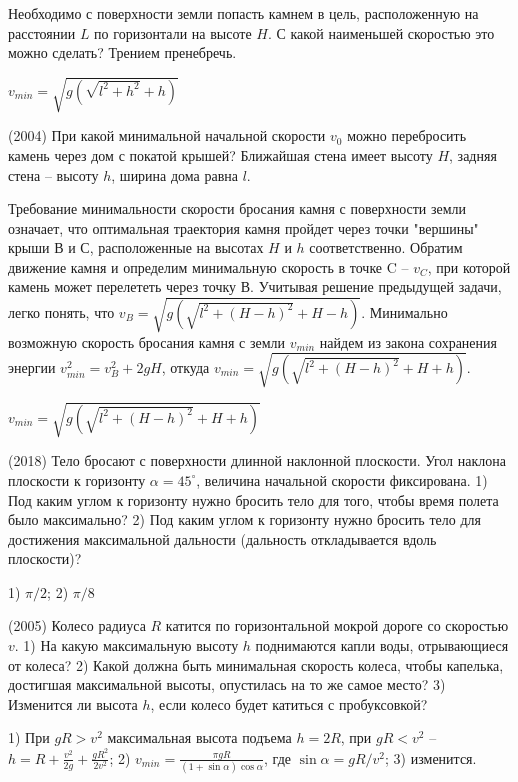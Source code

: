 \begin{ex}
Необходимо с поверхности земли попасть камнем в цель, расположенную на расстоянии $L$ по горизонтали на высоте $H$. С какой наименьшей скоростью это можно сделать? Трением пренебречь.
\begin{ans}
$v_{min} = \sqrt{g \left(\sqrt{l^2 + h^2} + h \right)}$
\end{ans}
\end{ex}

\begin{ex}
(2004) При какой минимальной начальной скорости $v_0$ можно перебросить камень через дом с покатой крышей? 
Ближайшая стена имеет высоту $H$, задняя стена -- высоту $h$, ширина дома равна $l$.
\begin{center}

\end{center}
\begin{sol}
Требование минимальности скорости бросания камня с поверхности земли означает, что оптимальная траектория камня пройдет через точки "вершины" крыши В и С, расположенные на высотах $H$ и $h$ соответственно. Обратим движение камня и определим минимальную скорость в точке C -- $v_C$, при которой камень может перелететь через точку В. Учитывая решение предыдущей задачи, легко понять, что $v_B = \sqrt{g \left(\sqrt{l^2 + (H-h)^2} + H-h \right)}$. Минимально возможную скорость бросания камня с земли $v_{min}$ найдем из закона сохранения энергии $v_{min}^2 = v_B^2 + 2gH$, откуда $v_{min} = \sqrt{g \left(\sqrt{l^2 + (H-h)^2} + H + h \right)}$.
\end{sol}
\begin{ans}
$v_{min} = \sqrt{g \left(\sqrt{l^2 + (H-h)^2} + H + h \right)}$
\end{ans}
\end{ex}

\begin{ex}
(2018) Тело бросают с поверхности длинной наклонной плоскости. Угол наклона плоскости к горизонту $\alpha = 45^{\circ}$, величина начальной скорости фиксирована. 1) Под каким углом к горизонту нужно бросить тело для того, чтобы время полета было максимально? 2) Под каким углом к горизонту нужно бросить тело для достижения максимальной дальности (дальность откладывается вдоль плоскости)?
\begin{ans}
1) $\pi/2$; 2) $\pi/8$
\end{ans}
\end{ex}

\begin{ex}
(2005) Колесо радиуса $R$ катится по горизонтальной мокрой дороге со скоростью $v$. 1) На какую максимальную высоту $h$ поднимаются капли воды, отрывающиеся от колеса? 2) Какой должна быть минимальная скорость колеса, чтобы капелька, достигшая максимальной высоты, опустилась на то же самое место? 3) Изменится ли высота $h$, если колесо будет катиться с пробуксовкой?
\begin{ans}
1) При $gR > v^2$ максимальная высота подъема $h = 2R$, при $gR < v^2$ -- $h = R +\frac{v^2}{2g} + \frac{gR^2}{2v^2}$; 2) $v_{min} = \frac{\pi g R}{(1+ \sin \alpha) \cos \alpha}$, где $\sin \alpha = gR/v^2$; 3) изменится.
\end{ans}
\end{ex}

